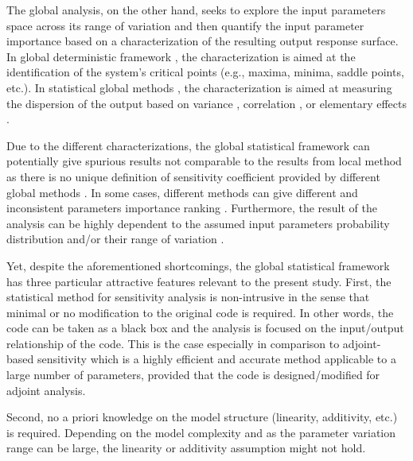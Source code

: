 The global analysis, on the other hand, 
seeks to explore the input parameters space across its range of variation 
and then quantify the input parameter importance based on a characterization of the resulting output response surface. 
In global deterministic framework \cite{Ionescu-Bujor2004,Cacuci2010}, 
the characterization is aimed at the identification of the system’s critical points (e.g., maxima, minima, saddle points, etc.). 
In statistical global methods \cite{Saltelli2008, Saltelli2004, Saltelli2006}, 
the characterization is aimed at measuring the dispersion of the output based on variance \cite{Sobol2001,Cukier1978}, 
correlation \cite{Helton1993}, or elementary effects \cite{Morris1991}.

Due to the different characterizations, 
the global statistical framework can potentially give spurious results not comparable to the results from local method 
as there is no unique definition of sensitivity coefficient provided by different global methods \cite{Razavi2015}. 
In some cases, different methods can give different and inconsistent parameters importance ranking \cite{Saltelli2008,Saltelli2004}. 
Furthermore, the result of the analysis can be highly dependent to the assumed input parameters probability distribution and/or their range of variation \cite{Cacuci2004,Cacuci2010}.

Yet, despite the aforementioned shortcomings, 
the global statistical framework has three particular attractive features relevant to the present study. 
First, the statistical method for sensitivity analysis is non-intrusive in the sense that minimal or no modification to the original code is required. 
In other words, the code can be taken as a black box and the analysis is focused on the input/output relationship \cite{Saltelli2008} of the code. 
This is the case especially in comparison to adjoint-based sensitivity \cite{Cacuci2000,Ionescu-Bujor2000} which is a highly efficient and accurate method applicable to a large number of parameters, 
provided that the code is designed/modified for adjoint analysis.

Second, no a priori knowledge on the model structure (linearity, additivity, etc.) is required. 
Depending on the model complexity and as the parameter variation range can be large, 
the linearity or additivity assumption might not hold.

